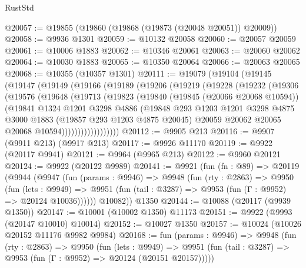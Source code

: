\begin{lexlean}{RustStd}
\begin{coremodule}
@20057 := @19855 (@19860 (@19868 (@19873 (@20048 @20051)) @20009))
@20058 := @9936 @1301
@20059 := @10132 @20058
@20060 := @20057 @20059
@20061 := @10006 @1883
@20062 := @10346 @20061
@20063 := @20060 @20062
@20064 := @10030 @1883
@20065 := @10350 @20064
@20066 := @20063 @20065
@20068 := @10355 (@10357 @1301)
@20111 := @19079
    (@19104
      (@19145
        (@19147
          (@19149
            (@19166
              (@19189
                (@19206
                  (@19219
                    (@19228
                      (@19232
                        (@19306
                          (@19576
                            (@19648
                              (@19713
                                (@19823
                                  (@19840
                                    (@19845 (@20066 @20068 @10594))
                                    (@19841
                                      @1324
                                      @1201
                                      @3298
                                      @4886
                                      (@19848
                                        @293
                                        @1203
                                        @1201
                                        @3298
                                        @4875
                                        @3000
                                        @1883
                                        (@19857 @293 @1203 @4875 @20045)
                                        @20059
                                        @20062
                                        @20065
                                        @20068
                                        @10594))))))))))))))))))
@20112 := @9905 @213
@20116 := @9907 (@9911 @213) (@9917 @213)
@20117 := @9926 @11170
@20119 := @9922 (@20117 @9941)
@20121 := @9964 (@9965 @213)
@20122 := @9960 @20121
@20124 := @9922 (@20122 @9989)
@20141 := @9921
    (fun (fn : @89) =>
    @20119
      (@9944
        (@9947
          (fun (params : @9946) =>
          @9948
            (fun (rty : @2863) =>
            @9950
              (fun (lets : @9949) =>
              @9951 (fun (tail : @3287) => @9953 (fun (Γ : @9952) => @20124 @10036))))))
        @10082))
    @1350
@20144 := @10088 (@20117 (@9939 @1350))
@20147 := @10001 (@10002 @1350) @11173
@20151 := @9922 (@9993 (@20147 @10010) @10014)
@20152 := @10027 @1350
@20157 := @10024 (@10026 @20152 @11176 @9982 @9984)
@20168 := fun (params : @9946) =>
  @9948
    (fun (rty : @2863) =>
    @9950
      (fun (lets : @9949) =>
      @9951 (fun (tail : @3287) => @9953 (fun (Γ : @9952) => @20124 (@20151 @20157)))))

\end{coremodule}
\end{lexlean}

